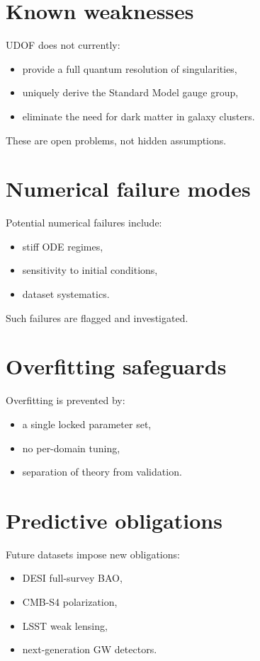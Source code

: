 \documentclass[11pt]{book}
\begin{document}
\section{Known weaknesses}

UDOF does not currently:
\begin{itemize}
\item provide a full quantum resolution of singularities,
\item uniquely derive the Standard Model gauge group,
\item eliminate the need for dark matter in galaxy clusters.
\end{itemize}

These are open problems, not hidden assumptions.

\section{Numerical failure modes}

Potential numerical failures include:
\begin{itemize}
\item stiff ODE regimes,
\item sensitivity to initial conditions,
\item dataset systematics.
\end{itemize}

Such failures are flagged and investigated.

\section{Overfitting safeguards}

Overfitting is prevented by:
\begin{itemize}
\item a single locked parameter set,
\item no per-domain tuning,
\item separation of theory from validation.
\end{itemize}

\section{Predictive obligations}

Future datasets impose new obligations:
\begin{itemize}
\item DESI full-survey BAO,
\item CMB-S4 polarization,
\item LSST weak lensing,
\item next-generation GW detectors.
\end{itemize}
\end{document}
